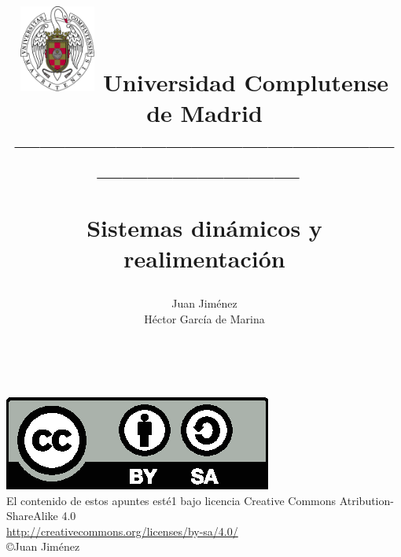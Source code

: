 \documentclass[a4paper,10pt]{book}
\begin{document}
\title{
\begin{flushleft}
\includegraphics[width=2.5cm]{ucm2.eps}
Universidad Complutense de Madrid\\
---------------------------------------------------------------------\
\end{flushleft}
Sistemas din\'amicos y realimentaci\'on}
\author{ Juan Jim\'enez \\ H\'ector Garc\'ia de Marina}

\maketitle\
\
\vspace*{\fill}

\includegraphics[scale=1]{by-sa.eps}\\
El contenido de estos apuntes est\'e1 bajo licencia Creative Commons Atribution-ShareAlike 4.0\\
\href{http://creativecommons.org/licenses/by-sa/4.0/}{http://creativecommons.org/licenses/by-sa/4.0/}\\
\copyright Juan Jim\'enez

\bigskip
\tableofcontents
\listoffigures
\listoftables






\printindex
\end{document}
